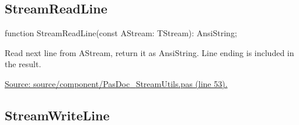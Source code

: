\documentclass{report}
\newif\ifpdf
\begin{document}
\subsection*{StreamReadLine}
\fi
\label{PasDoc_StreamUtils-StreamReadLine}
\begin{list}{}{
\setlength{\itemindent}{0cm}
\setlength{\listparindent}{0cm}
\setlength{\leftmargin}{\evensidemargin}
\addtolength{\leftmargin}{\tmplength}
\settowidth{\labelsep}{X}
\addtolength{\leftmargin}{\labelsep}
\setlength{\labelwidth}{\tmplength}
}
\item[\textbf{Declaration}\hfill]
\ifpdf
\begin{flushleft}
\fi
\begin{ttfamily}
function StreamReadLine(const AStream: TStream): AnsiString;\end{ttfamily}

\ifpdf
\end{flushleft}
\fi

\par
\item[\textbf{Description}]
Read next line from AStream, return it as AnsiString. Line ending is included in the result.\par
\href{https://github.com/pasdoc/pasdoc/blob/master/source/component/PasDoc_StreamUtils.pas#L53}{Source: source/component/PasDoc{\_}StreamUtils.pas (line 53).}

\end{list}
\ifpdf
\subsection*{\large{\textbf{StreamWriteLine}}\normalsize\hspace{1ex}\hrulefill}
\else
\end{document}
